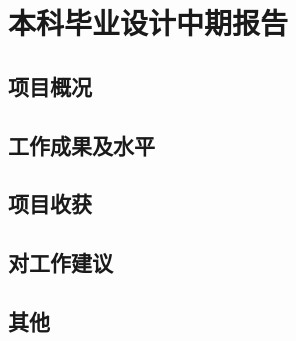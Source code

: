 \chapter{本科毕业设计中期报告}

\section{项目概况}

\section{工作成果及水平}

\section{项目收获}

\section{对工作建议}

\section{其他}
